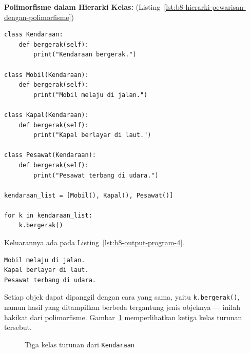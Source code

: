 \textbf{Polimorfisme dalam Hierarki Kelas:} (Listing~\ref{lst:b8-hierarki-pewarisan-dengan-polimorfisme})

\begin{lstlisting}[style=PythonStyle, caption={Hierarki Pewarisan dengan Polimorfisme}, label={lst:b8-hierarki-pewarisan-dengan-polimorfisme}]
class Kendaraan:
    def bergerak(self):
        print("Kendaraan bergerak.")

class Mobil(Kendaraan):
    def bergerak(self):
        print("Mobil melaju di jalan.")

class Kapal(Kendaraan):
    def bergerak(self):
        print("Kapal berlayar di laut.")

class Pesawat(Kendaraan):
    def bergerak(self):
        print("Pesawat terbang di udara.")

kendaraan_list = [Mobil(), Kapal(), Pesawat()]

for k in kendaraan_list:
    k.bergerak()
\end{lstlisting}

Keluarannya ada pada Listing~\ref{lst:b8-output-program-4}.

\begin{lstlisting}[language=bash, caption={Output Program}, label={lst:b8-output-program-4}]
Mobil melaju di jalan.
Kapal berlayar di laut.
Pesawat terbang di udara.
\end{lstlisting}

Setiap objek dapat dipanggil dengan cara yang sama, yaitu \texttt{k.bergerak()},  
namun hasil yang ditampilkan berbeda tergantung jenis objeknya — inilah hakikat dari polimorfisme. Gambar~\ref{fig:b8-polimorfisme} memperlihatkan ketiga kelas turunan tersebut.

\begin{figure}[H]
  \centering
  \caption{Tiga kelas turunan dari \texttt{Kendaraan}}
  \label{fig:b8-polimorfisme}
\end{figure}

